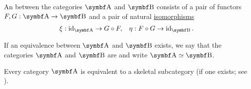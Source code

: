 \begin{definition}\label{def:category_equivalence}
  An  between the categories \( \Cat{A} \) and \( \Cat{B} \) consists of a pair of functors \( F, G: \Cat{A} \to \Cat{B} \) and a pair of natural \hyperref[def:natural_isomorpism]{isomorphisms}
  \begin{align*}
    \xi: \Id_{\Cat{A}} \to G \circ F,
     &  &
    \eta: F \circ G \to \Id_{\Cat{B}}.
  \end{align*}

  If an equivalence between \( \Cat{A} \) and \( \Cat{B} \) exists, we say that the categories \( \Cat{A} \) and \( \Cat{B} \) are  and write \( \Cat{A} \simeq \Cat{B} \).
\end{definition}

\begin{proposition}\label{thm:skeletal_subcategory_equivalence}
  Every category \( \Cat{A} \) is equivalent to a skeletal subcategory (if one exists; see ).
\end{proposition}

